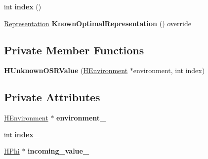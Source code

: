 \begin{DoxyCompactItemize}
\item 
int {\bfseries index} ()\hypertarget{classv8_1_1internal_1_1_h_unknown_o_s_r_value_a702f99ed2aabbe6632c2ee41cf136560}{}\label{classv8_1_1internal_1_1_h_unknown_o_s_r_value_a702f99ed2aabbe6632c2ee41cf136560}

\item 
\hyperlink{classv8_1_1internal_1_1_representation}{Representation} {\bfseries Known\+Optimal\+Representation} () override\hypertarget{classv8_1_1internal_1_1_h_unknown_o_s_r_value_a92a003676103e6e548daa74eec1114a2}{}\label{classv8_1_1internal_1_1_h_unknown_o_s_r_value_a92a003676103e6e548daa74eec1114a2}

\end{DoxyCompactItemize}
\subsection*{Private Member Functions}
\begin{DoxyCompactItemize}
\item 
{\bfseries H\+Unknown\+O\+S\+R\+Value} (\hyperlink{classv8_1_1internal_1_1_h_environment}{H\+Environment} $\ast$environment, int index)\hypertarget{classv8_1_1internal_1_1_h_unknown_o_s_r_value_af11ebc523a56082c18e8bdf0703b0305}{}\label{classv8_1_1internal_1_1_h_unknown_o_s_r_value_af11ebc523a56082c18e8bdf0703b0305}

\end{DoxyCompactItemize}
\subsection*{Private Attributes}
\begin{DoxyCompactItemize}
\item 
\hyperlink{classv8_1_1internal_1_1_h_environment}{H\+Environment} $\ast$ {\bfseries environment\+\_\+}\hypertarget{classv8_1_1internal_1_1_h_unknown_o_s_r_value_a1d9697f5bd75eab3c431597c3a296bb4}{}\label{classv8_1_1internal_1_1_h_unknown_o_s_r_value_a1d9697f5bd75eab3c431597c3a296bb4}

\item 
int {\bfseries index\+\_\+}\hypertarget{classv8_1_1internal_1_1_h_unknown_o_s_r_value_aa061a92d2ee4f66b284b8ecc24b5ffe8}{}\label{classv8_1_1internal_1_1_h_unknown_o_s_r_value_aa061a92d2ee4f66b284b8ecc24b5ffe8}

\item 
\hyperlink{classv8_1_1internal_1_1_h_phi}{H\+Phi} $\ast$ {\bfseries incoming\+\_\+value\+\_\+}\hypertarget{classv8_1_1internal_1_1_h_unknown_o_s_r_value_aae6e163739c5a555a4e4a1feacae4a31}{}\label{classv8_1_1internal_1_1_h_unknown_o_s_r_value_aae6e163739c5a555a4e4a1feacae4a31}

\end{DoxyCompactItemize}
